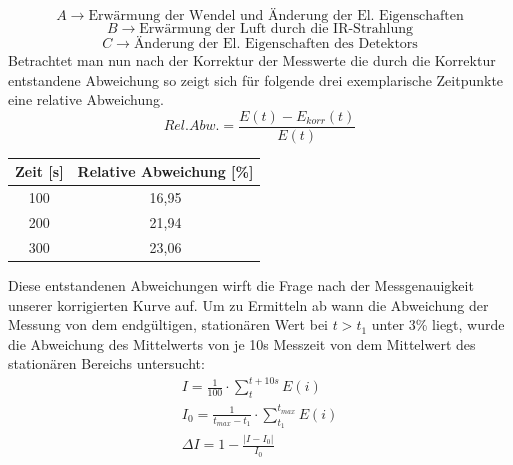 \documentclass{article}
\begin{document}
            $$ A\rightarrow \text{Erwärmung der Wendel und Änderung der El. Eigenschaften}$$
            $$ B\rightarrow \text{Erwärmung der Luft durch die IR-Strahlung}$$
            $$ C\rightarrow \text{Änderung der El. Eigenschaften des Detektors}$$
            Betrachtet man nun nach der Korrektur der Messwerte die durch die Korrektur entstandene Abweichung
            so zeigt sich für folgende drei exemplarische Zeitpunkte eine relative Abweichung.
            \begin{equation}
                Rel.Abw. = \frac{E(t)-E_{korr}(t)}{E(t)}
            \end{equation}
            \begin{center}
                \begin{tabular}{|c|c|}
                    \hline
                    Zeit [s] & Relative Abweichung [\%] \\
                    \hline
                    100 & 16,95 \\
                    200 & 21,94 \\
                    300 & 23,06 \\
                    \hline
                \end{tabular}
            \end{center}
            Diese entstandenen Abweichungen wirft die Frage nach der Messgenauigkeit unserer 
            korrigierten Kurve auf. Um zu Ermitteln ab wann die Abweichung der Messung von dem
            endgültigen, stationären Wert bei $t>t_1$ unter 3\% liegt, wurde die Abweichung des
            Mittelwerts von je 10s Messzeit von dem Mittelwert des stationären Bereichs untersucht:
            \begin{equation}
                \begin{aligned}
                    I = \frac{1}{100}\cdot \sum_t^{t+10s}{E(i)} \\
                    I_0 = \frac{1}{t_{max}-t_1}\cdot \sum_{t_1}^{t_{max}}{E(i)}\\
                    \Delta I = 1-\frac{|I-I_0|}{I_0} \\
                \end{aligned} 
            \end{equation}
\end{document}

